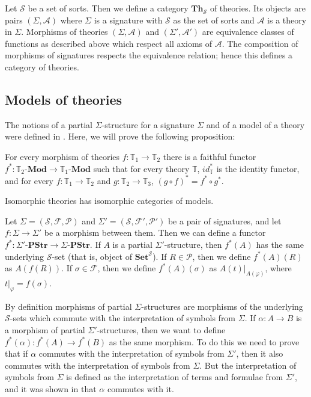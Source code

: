 \documentclass{amsart}
\theoremstyle{definition}
\theoremstyle{remark}
\newcommand{\cat}[1]{\mathbf{#1}}
\newcommand{\Set}{\cat{Set}}
\newcommand{\PStr}[1]{#1\text{-}\cat{PStr}}
\newcommand{\Mod}[1]{#1\text{-}\cat{Mod}}
\newcommand{\Th}{\cat{Th}}
\numberwithin{figure}{section}
\begin{document}
Let $\mathcal{S}$ be a set of sorts.
Then we define a category $\Th_\mathcal{S}$ of theories.
Its objects are pairs $(\Sigma,\mathcal{A})$ where $\Sigma$ is a signature with $\mathcal{S}$ as the set of sorts and $\mathcal{A}$ is a theory in $\Sigma$.
Morphisms of theories $(\Sigma,\mathcal{A})$ and $(\Sigma',\mathcal{A}')$
are equivalence classes of functions as described above which respect all axioms of $\mathcal{A}$.
The composition of morphisms of signatures respects the equivalence relation; hence this defines a category of theories.

\subsection{Models of theories}

The notions of a partial $\Sigma$-structure for a signature $\Sigma$ and of a model of a theory were defined in \cite{PHL}.
Here, we will prove the following proposition:

\begin{prop}
For every morphism of theories $f : \mathbb{T}_1 \to \mathbb{T}_2$ there is a faithful functor $f^* : \Mod{\mathbb{T}_2} \to \Mod{\mathbb{T}_1}$ such that
for every theory $\mathbb{T}$, $id_\mathbb{T}^*$ is the identity functor,
and for every $f : \mathbb{T}_1 \to \mathbb{T}_2$ and $g : \mathbb{T}_2 \to \mathbb{T}_3$, $(g \circ f)^* = f^* \circ g^*$.
\end{prop}

\begin{cor}
Isomorphic theories has isomorphic categories of models.
\end{cor}

Let $\Sigma = (\mathcal{S},\mathcal{F},\mathcal{P})$ and $\Sigma' = (\mathcal{S},\mathcal{F}',\mathcal{P}')$ be a pair of signatures,
and let $f : \Sigma \to \Sigma'$ be a morphism between them.
Then we can define a functor $f^* : \PStr{\Sigma'} \to \PStr{\Sigma}$.
If $A$ is a partial $\Sigma'$-structure, then $f^*(A)$ has the same underlying $\mathcal{S}$-set (that is, object of $\Set^\mathcal{S}$).
If $R \in \mathcal{P}$, then we define $f^*(A)(R)$ as $A(f(R))$.
If $\sigma \in \mathcal{F}$, then we define $f^*(A)(\sigma)$ as $A(t)|_{A(\varphi)}$, where $t|_\varphi = f(\sigma)$.

By definition morphisms of partial $\Sigma$-structures are morphisms of the underlying $\mathcal{S}$-sets which commute with the interpretation of symbols from $\Sigma$.
If $\alpha : A \to B$ is a morphism of partial $\Sigma'$-structures, then we want to define $f^*(\alpha) : f^*(A) \to f^*(B)$ as the same morphism.
To do this we need to prove that if $\alpha$ commutes with the interpretation of symbols from $\Sigma'$, then it also commutes with the interpretation of symbols from $\Sigma$.
But the interpretation of symbols from $\Sigma$ is defined as the interpretation of terms and formulae from $\Sigma'$, and it was shown in \cite{PHL} that $\alpha$ commutes with it.
\end{document}

